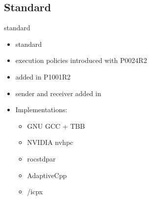 \subsection{Standard \cpp}

standard \cpp
\begin{itemize}
    \item {} standard~\cite{international_organization_for_standardization_isoiec_2017}
    \item execution policies introduced with  P0024R2~\cite{hoberock_p0024r2_2016}
    \item {} added in  P1001R2~\cite{meredith_p1001r2_2019}
    \item sender and receiver added in ~\cite{dominiak_p2300r10_2024, baker_p3396r0_2024, niebler_p3325r5_2024}
    \item Implementations:
    \begin{itemize}
        \item GNU GCC + TBB
        \item NVIDIA nvhpc
        \item rocstdpar
        \item AdaptiveCpp
        \item \dpcpp/icpx
    \end{itemize}
\end{itemize}
